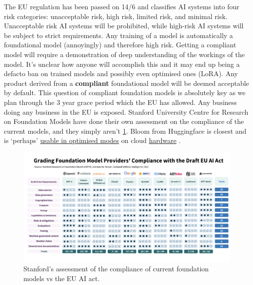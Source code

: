 The EU regulation has been passed on 14/6 and classifies AI systems into four risk categories: unacceptable risk, high risk, limited risk, and minimal risk. Unacceptable risk AI systems will be prohibited, while high-risk AI systems will be subject to strict requirements. Any training of a model is automatically a foundational model (annoyingly) and therefore high risk. Getting a compliant model will require a demonstration of deep understanding of the workings of the model. It's unclear how anyone will accomplish this and it may end up being a defacto ban on trained models and possibly even optimised ones (LoRA). Any product derived from a \textbf{compliant} foundational model will be deemed acceptable by default. This question of compliant foundation models is absolutely key as we plan through the 3 year grace period which the EU has allowed. Any business doing any business in the EU is exposed. Stanford University Centre for Research on Foundation Models have done their own assessment on the compliance of the current models, and they simply aren't \ref{fig:euAIcompliance}. Bloom from Huggingface is closest and is `perhaps' \href{https://huggingface.co/BelleGroup/BELLE_BLOOM_GPTQ_4BIT}{usable in optimised modes} on cloud \href{https://lambdalabs.com/nvidia-h100-gpus}{hardware} \cite{dettmers2022case}. 

\begin{figure}[htbp]
    \centering
    \includegraphics{euaicompliance}
    \caption{Stanford's assessment of the compliance of current foundation models vs the EU AI act.}
    \label{fig:euAIcompliance}
\end{figure}


